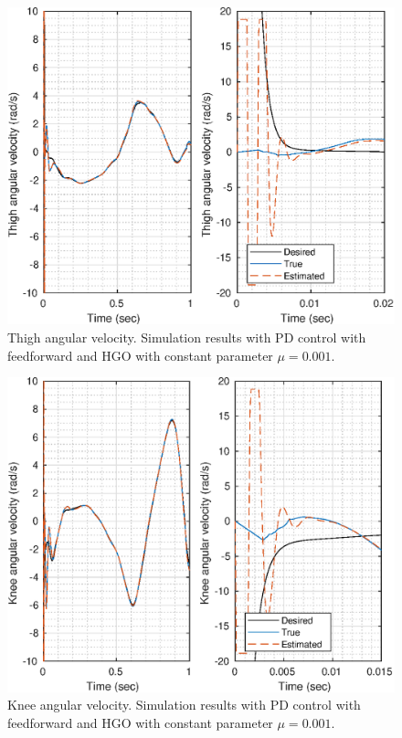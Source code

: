 \documentclass[letterpaper, 10 pt, conference]{ieeeconf}  %
\theoremstyle{plain}
\theoremstyle{definition}
\theoremstyle{remark}
\begin{document}
%
%
\begin{figure}[h!]
\begin{center}
\includegraphics[width = 13cm]{Figs/dq_thigh_mu_1e-03.eps}
\caption{Thigh angular velocity. Simulation results with PD control with feedforward and HGO with constant parameter $\mu=0.001$.}
\label{fig:dthigh}
\end{center}
\end{figure}
%
%
\begin{figure}[h!]
\begin{center}
\includegraphics[width = 13cm]{Figs/dq_knee_mu_1e-03.eps}
\caption{Knee angular velocity. Simulation results with PD control with feedforward and HGO with constant parameter $\mu=0.001$.}
\label{fig:dknee}
\end{center}
\end{figure}
\end{document}
